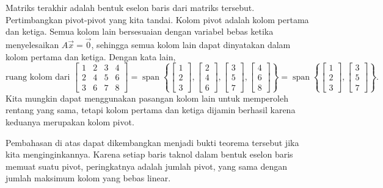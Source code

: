 Matriks terakhir adalah bentuk eselon baris dari matriks tersebut.
Pertimbangkan pivot-pivot yang kita tandai.
Kolom pivot adalah kolom pertama dan ketiga.
Semua kolom lain bersesuaian dengan variabel bebas ketika menyelesaikan
$A \vec{x} = \vec{0}$, sehingga semua kolom lain dapat dinyatakan dalam kolom pertama dan
ketiga. Dengan kata lain,
\begin{equation*}
\text{ruang kolom dari }
\begin{bmatrix}
1 & 2 & 3 & 4 \\
2 & 4 & 5 & 6 \\
3 & 6 & 7 & 8
\end{bmatrix}
=
\operatorname{span}
\left\{
\begin{bmatrix}
1 \\
2 \\
3
\end{bmatrix}
,
\begin{bmatrix}
2 \\
4 \\
6
\end{bmatrix}
,
\begin{bmatrix}
3 \\
5 \\
7
\end{bmatrix}
,
\begin{bmatrix}
4 \\
6 \\
8
\end{bmatrix}
\right\}
=
\operatorname{span}
\left\{
\begin{bmatrix}
1 \\
2 \\
3
\end{bmatrix}
,
\begin{bmatrix}
3 \\
5 \\
7
\end{bmatrix}
\right\} .
\end{equation*}
Kita mungkin dapat menggunakan pasangan kolom lain untuk memperoleh rentang yang sama, tetapi kolom
pertama dan ketiga dijamin berhasil karena keduanya merupakan kolom pivot.

Pembahasan di atas dapat dikembangkan menjadi bukti teorema tersebut jika
kita menginginkannya.
Karena setiap baris taknol
dalam bentuk eselon baris memuat suatu pivot, peringkatnya adalah jumlah
pivot, yang sama dengan jumlah maksimum kolom yang bebas
linear.

\medskip


